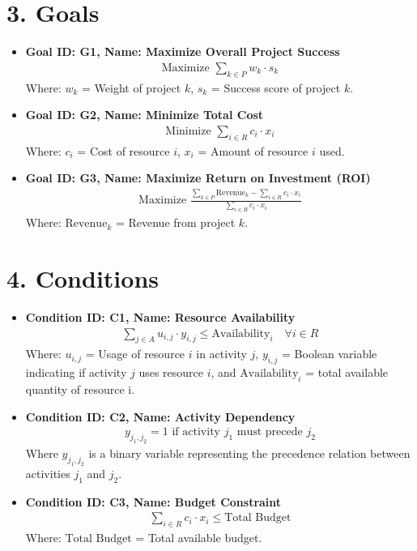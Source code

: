 \documentclass{article}
\begin{document}
\section{3. Goals}
\begin{itemize}
    \item \textbf{Goal ID: G1, Name: Maximize Overall Project Success}
        \begin{align*}
        \text{Maximize } \sum_{k \in P} w_k \cdot s_k
        \end{align*}
        Where: $w_k$ = Weight of project $k$, $s_k$ = Success score of project $k$.

    \item \textbf{Goal ID: G2, Name: Minimize Total Cost}
        \begin{align*}
        \text{Minimize } \sum_{i \in R} c_i \cdot x_i
        \end{align*}
        Where: $c_i$ = Cost of resource $i$, $x_i$ = Amount of resource $i$ used.

    \item \textbf{Goal ID: G3, Name: Maximize Return on Investment (ROI)}
        \begin{align*}
        \text{Maximize } \frac{\sum_{k \in P} \text{Revenue}_k - \sum_{i \in R} c_i \cdot x_i}{\sum_{i \in R} c_i \cdot x_i}
        \end{align*}
        Where: $\text{Revenue}_k$ = Revenue from project $k$.

\end{itemize}

\section{4. Conditions}
\begin{itemize}
    \item \textbf{Condition ID: C1, Name: Resource Availability}
        \begin{align*}
        \sum_{j \in A} u_{i,j} \cdot y_{i,j} \le \text{Availability}_i \quad \forall i \in R
        \end{align*}
        Where: $u_{i,j}$ = Usage of resource $i$ in activity $j$,  $y_{i,j}$ = Boolean variable indicating if activity $j$ uses resource $i$, and $\text{Availability}_i$ = total available quantity of resource i.

    \item \textbf{Condition ID: C2, Name: Activity Dependency}
        \begin{align*}
        y_{j_1,j_2} = 1 \text{ if activity } j_1 \text{ must precede } j_2
        \end{align*}
        Where $y_{j_1,j_2}$ is a binary variable representing the precedence relation between activities $j_1$ and $j_2$.

    \item \textbf{Condition ID: C3, Name: Budget Constraint}
        \begin{align*}
        \sum_{i \in R} c_i \cdot x_i \le \text{Total Budget}
        \end{align*}
        Where: $\text{Total Budget}$ = Total available budget.

\end{itemize}
\end{document}
